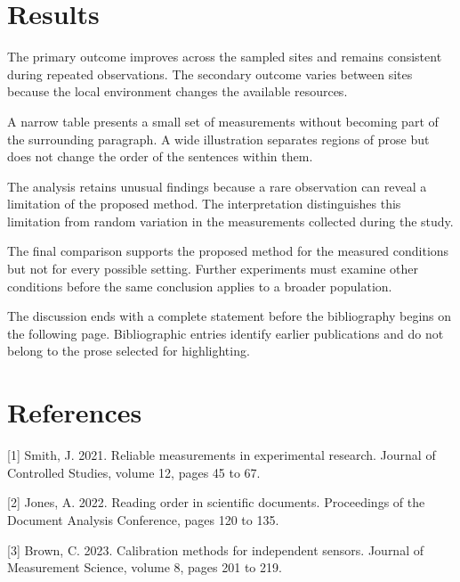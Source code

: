 \documentclass[10pt,onecolumn]{article}
\begin{document}
\section{Results}
The primary outcome improves across the sampled sites and remains consistent during repeated observations. The secondary outcome varies between sites because the local environment changes the available resources.


A narrow table presents a small set of measurements without becoming part of the surrounding paragraph. A wide illustration separates regions of prose but does not change the order of the sentences within them.


The analysis retains unusual findings because a rare observation can reveal a limitation of the proposed method. The interpretation distinguishes this limitation from random variation in the measurements collected during the study.


The final comparison supports the proposed method for the measured conditions but not for every possible setting. Further experiments must examine other conditions before the same conclusion applies to a broader population.


The discussion ends with a complete statement before the bibliography begins on the following page. Bibliographic entries identify earlier publications and do not belong to the prose selected for highlighting.


\clearpage
\nolinenumbers
\section*{References}
[1] Smith, J. 2021. Reliable measurements in experimental research. Journal of Controlled Studies, volume 12, pages 45 to 67.

[2] Jones, A. 2022. Reading order in scientific documents. Proceedings of the Document Analysis Conference, pages 120 to 135.

[3] Brown, C. 2023. Calibration methods for independent sensors. Journal of Measurement Science, volume 8, pages 201 to 219.
\end{document}
